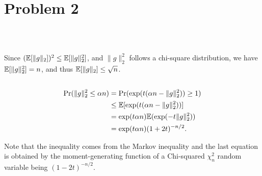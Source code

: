 \section{Problem 2}~\label{sec:prob2}

\subsection{} %

Since $({\mathbb{E}}[\|g\|_2])^2 \le {\mathbb{E}}[\|g\|_2^2]$,
and $\|g\|_2^2$ follows a chi-square distribution,
we have ${\mathbb{E}}[\|g\|_2^2]=n$,
and thus ${\mathbb{E}}[\|g\|_2]\le \sqrt{n}$.

\subsection{} %

\begin{equation}
\begin{split}
{\text{Pr}}(\|g\|_2^2\le\alpha n) & = {\text{Pr}}(\exp(t(\alpha n-\|g\|_2^2))\ge 1) \\
    & \le  {\mathbb{E}}[\exp(t(\alpha n-\|g\|_2^2))]  \\
    & = \exp(t\alpha n) {\mathbb{E}}(\exp(-t\|g\|_2^2))   \\
    & = \exp(t\alpha n) (1+2t)^{-n/2}. \\
\end{split}
\end{equation}

Note that the inequality comes from the Markov inequality and
the last equation is obtained by the moment-generating
function of a Chi-squared $\chi^2_n$ random variable
being $(1-2t)^{-n/2}$.

\subsection{} %
